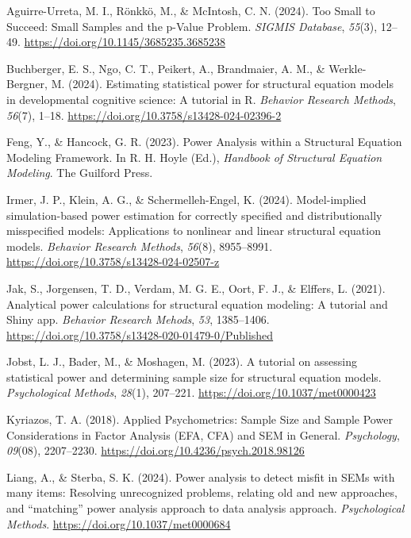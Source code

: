 \documentclass[
  letterpaper,
  DIV=11,
  numbers=noendperiod]{scrartcl}
\newlength{\cslhangindent}
\newenvironment{CSLReferences}[2] %
 {\begin{list}{}{%
  \setlength{\itemindent}{0pt}
  \setlength{\leftmargin}{0pt}
  \setlength{\parsep}{0pt}
  \ifodd #1
   \setlength{\leftmargin}{\cslhangindent}
   \setlength{\itemindent}{-1\cslhangindent}
  \fi
  \setlength{\itemsep}{#2\baselineskip}}}
 {\end{list}}
\begin{document}
\protect{}\label{refs}
\begin{CSLReferences}{1}{0}
Aguirre-Urreta, M. I., Rönkkö, M., \& McIntosh, C. N. (2024). Too
{Small} to {Succeed}: {Small Samples} and the p-{Value Problem}.
\emph{SIGMIS Database}, \emph{55}(3), 12--49.
\url{https://doi.org/10.1145/3685235.3685238}

Buchberger, E. S., Ngo, C. T., Peikert, A., Brandmaier, A. M., \&
Werkle-Bergner, M. (2024). Estimating statistical power for structural
equation models in developmental cognitive science: {A} tutorial in {R}.
\emph{Behavior Research Methods}, \emph{56}(7), 1--18.
\url{https://doi.org/10.3758/s13428-024-02396-2}

Feng, Y., \& Hancock, G. R. (2023). Power {Analysis} within a
{Structural Equation Modeling Framework}. In R. H. Hoyle (Ed.),
\emph{Handbook of {Structural Equation Modeling}}. The Guilford Press.

Irmer, J. P., Klein, A. G., \& Schermelleh-Engel, K. (2024).
Model-implied simulation-based power estimation for correctly specified
and distributionally misspecified models: Applications to nonlinear and
linear structural equation models. \emph{Behavior Research Methods},
\emph{56}(8), 8955--8991.
\url{https://doi.org/10.3758/s13428-024-02507-z}

Jak, S., Jorgensen, T. D., Verdam, M. G. E., Oort, F. J., \& Elffers, L.
(2021). Analytical power calculations for structural equation modeling:
{A} tutorial and {Shiny} app. \emph{Behavior Research Mehods},
\emph{53}, 1385--1406.
\url{https://doi.org/10.3758/s13428-020-01479-0/Published}

Jobst, L. J., Bader, M., \& Moshagen, M. (2023). A tutorial on assessing
statistical power and determining sample size for structural equation
models. \emph{Psychological Methods}, \emph{28}(1), 207--221.
\url{https://doi.org/10.1037/met0000423}

Kyriazos, T. A. (2018). Applied {Psychometrics}: {Sample Size} and
{Sample Power Considerations} in {Factor Analysis} ({EFA}, {CFA}) and
{SEM} in {General}. \emph{Psychology}, \emph{09}(08), 2207--2230.
\url{https://doi.org/10.4236/psych.2018.98126}

Liang, A., \& Sterba, S. K. (2024). Power analysis to detect misfit in
{SEMs} with many items: Resolving unrecognized problems, relating old
and new approaches, and {``matching''} power analysis approach to data
analysis approach. \emph{Psychological Methods}.
\url{https://doi.org/10.1037/met0000684}


\end{CSLReferences}
\end{document}

